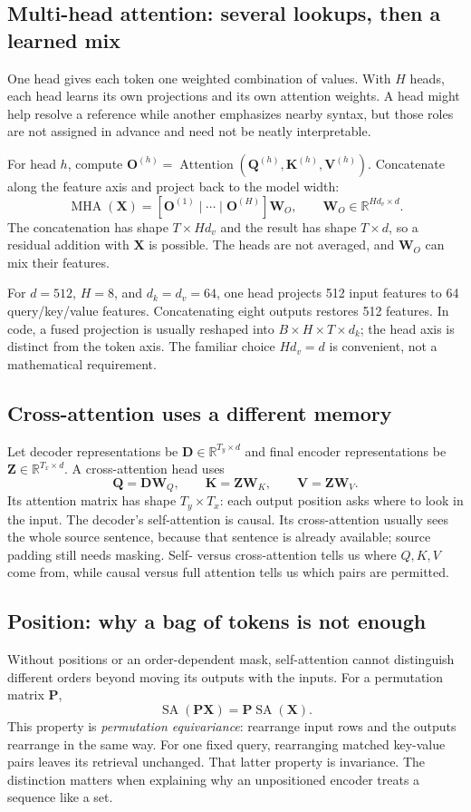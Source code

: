 \documentclass[11pt, oneside]{book}
\newcommand{\R}{\mathbb{R}}
\let\originalsubsection\subsection
\renewcommand{\subsection}{\Needspace{6\baselineskip}\originalsubsection}
\begin{document}
\subsection*{Multi-head attention: several lookups, then a learned mix}
One head gives each token one weighted combination of values. With $H$ heads, each head learns its own projections and its own attention weights. A head might help resolve a reference while another emphasizes nearby syntax, but those roles are not assigned in advance and need not be neatly interpretable.

For head $h$, compute $\mathbf{O}^{(h)}=\operatorname{Attention}(\mathbf{Q}^{(h)},\mathbf{K}^{(h)},\mathbf{V}^{(h)})$. Concatenate along the feature axis and project back to the model width:
\[
 \operatorname{MHA}(\mathbf{X})=
 [\mathbf{O}^{(1)}\mid\cdots\mid\mathbf{O}^{(H)}]\mathbf{W}_O,
 \qquad \mathbf{W}_O\in\R^{Hd_v\times d}.
\]
The concatenation has shape $T\times Hd_v$ and the result has shape $T\times d$, so a residual addition with $\mathbf{X}$ is possible. The heads are not averaged, and $\mathbf{W}_O$ can mix their features.

For $d=512$, $H=8$, and $d_k=d_v=64$, one head projects 512 input features to 64 query/key/value features. Concatenating eight outputs restores 512 features. In code, a fused projection is usually reshaped into $B\times H\times T\times d_k$; the head axis is distinct from the token axis. The familiar choice $Hd_v=d$ is convenient, not a mathematical requirement.

\subsection*{Cross-attention uses a different memory}
Let decoder representations be $\mathbf{D}\in\R^{T_y\times d}$ and final encoder representations be $\mathbf{Z}\in\R^{T_x\times d}$. A cross-attention head uses
\[
 \mathbf{Q}=\mathbf{D}\mathbf{W}_Q,\qquad
 \mathbf{K}=\mathbf{Z}\mathbf{W}_K,\qquad
 \mathbf{V}=\mathbf{Z}\mathbf{W}_V.
\]
Its attention matrix has shape $T_y\times T_x$: each output position asks where to look in the input. The decoder's self-attention is causal. Its cross-attention usually sees the whole source sentence, because that sentence is already available; source padding still needs masking. Self- versus cross-attention tells us where $Q,K,V$ come from, while causal versus full attention tells us which pairs are permitted.

\subsection*{Position: why a bag of tokens is not enough}
Without positions or an order-dependent mask, self-attention cannot distinguish different orders beyond moving its outputs with the inputs. For a permutation matrix $\mathbf{P}$,
\[
 \operatorname{SA}(\mathbf{P}\mathbf{X})=\mathbf{P}\operatorname{SA}(\mathbf{X}).
\]
This property is \emph{permutation equivariance}: rearrange input rows and the outputs rearrange in the same way. For one fixed query, rearranging matched key-value pairs leaves its retrieval unchanged. That latter property is invariance. The distinction matters when explaining why an unpositioned encoder treats a sequence like a set.
\end{document}
